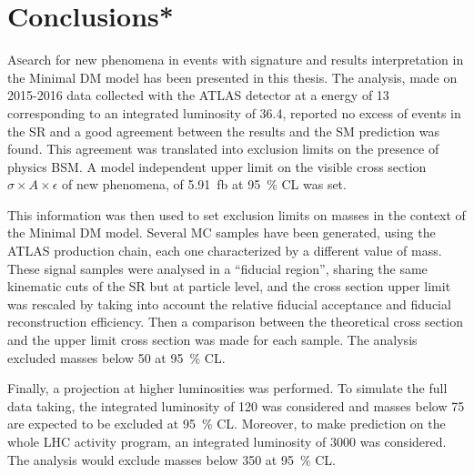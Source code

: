 \chapter{Conclusions*}
\lettrine{A} search for new phenomena in events with \mph signature and results interpretation in the Minimal DM model has been presented in this thesis.
The analysis, made on 2015-2016 data collected with the ATLAS detector at a \cm energy of \SI{13}{\tev} corresponding to an integrated luminosity of \SI{36.4}{\ifb}, reported no excess of events in the SR and a good agreement between the results and the SM prediction was found. 
This agreement was translated into exclusion limits on the presence of physics BSM. A model independent upper limit on the visible cross section $\sigma\times A\times\epsilon$ of new phenomena, of \SI{5.91}{fb} at \SI{95}{\percent} CL was set.

This information was then used to set exclusion limits on \chizero masses in the context of the Minimal DM model. Several MC samples have been generated, using the ATLAS production chain, each one characterized by a different value of \chizero mass. These signal samples were analysed in a ``fiducial region'', sharing the same kinematic cuts of the SR but at particle level, and the cross section upper limit was rescaled by taking into account the relative fiducial acceptance and fiducial reconstruction efficiency. Then a comparison between the theoretical cross section and the upper limit cross section was made for each sample. The \mph analysis excluded masses below \SI{50}{\gev} at \SI{95}{\percent} CL.

Finally, a projection at higher luminosities was performed. To simulate the full \RunTwo data taking, the integrated luminosity of \SI{120}{\ifb} was considered and masses below \SI{75}{\gev} are expected to be excluded at \SI{95}{\percent} CL. Moreover, to make prediction on the whole LHC activity program, an integrated luminosity of \SI{3000}{\ifb} was considered. The \mph analysis would exclude masses below \SI{350}{\gev} at \SI{95}{\percent} CL.



